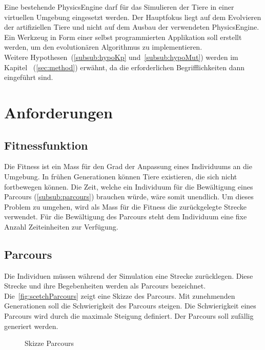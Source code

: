     Eine bestehende \gls{PhysicsEngine} darf für das Simulieren der Tiere in einer virtuellen Umgebung eingesetzt werden.
    Der Hauptfokus liegt auf dem Evolvieren der artifiziellen Tiere und
    nicht auf dem Ausbau der verwendeten \gls{PhysicsEngine}.
    Ein Werkzeug in Form einer selbst programmierten Applikation soll erstellt werden,
    um den evolutionären Algorithmus zu implementieren.
    \\
    Weitere Hypothesen~(\vref{subsub:hypoKp} und~\vref{subsub:hypoMut})
    werden im Kapitel ~(\vref{sec:method}) erwähnt,
    da die erforderlichen Begrifflichkeiten dann eingeführt sind.

  \section{Anforderungen}

    \subsection{Fitnessfunktion\label{sub:reqFitness}}

      Die Fitness ist ein Mass für den Grad der Anpassung eines Individuums an die Umgebung.
      In frühen Generationen können Tiere existieren, die sich nicht fortbewegen können.
      Die Zeit, welche ein Individuum für die Bewältigung eines Parcours (\vref{subsub:parcours}) brauchen würde,
      wäre somit unendlich.
      Um dieses Problem zu umgehen, wird als Mass für die Fitness die zurückgelegte Strecke verwendet.
      Für die Bewältigung des Parcours steht dem Individuum eine fixe Anzahl Zeiteinheiten zur Verfügung.

    \subsection{Parcours\label{subsub:parcours}}

      Die Individuen müssen während der Simulation eine Strecke zurücklegen.
      Diese Strecke und ihre Begebenheiten werden als Parcours bezeichnet.
      Die~\vref{fig:scetchParcours} zeigt eine Skizze des Parcours.
      Mit zunehmenden Generationen soll die Schwierigkeit des Parcours steigen.
      Die Schwierigkeit eines Parcours wird durch die maximale Steigung definiert.
      Der Parcours soll zufällig generiert werden.

      \begin{figure}[H]
        
        \caption{Skizze Parcours\label{fig:scetchParcours}}
      \end{figure}


